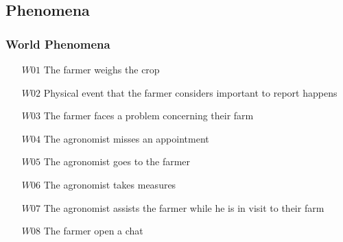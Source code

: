 \documentclass[10pt]{report}
\begin{document}
        \subsection{Phenomena}
            \subsubsection{World Phenomena}
                \begin{itemize}%
                    \item [$W01$] The farmer weighs the crop
                    \item [$W02$] Physical event that the farmer considers important to report happens
                    \item [$W03$] The farmer faces a problem concerning their farm
                    \item [$W04$] The agronomist misses an appointment
                    \item [$W05$] The agronomist goes to the farmer
                    \item [$W06$] The agronomist takes measures 
                    \item [$W07$] The agronomist assists the farmer while he is in visit to their farm
                    \item [$W08$] The farmer open a chat 
                \end{itemize}
\end{document}
